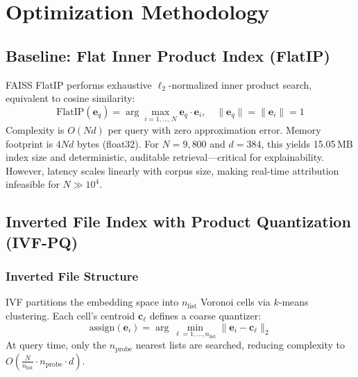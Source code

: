 \documentclass[conference]{IEEEtran}
\begin{document}
\section{Optimization Methodology}

\subsection{Baseline: Flat Inner Product Index (FlatIP)}

FAISS FlatIP performs exhaustive $\ell_2$-normalized inner product search, equivalent to cosine similarity:
\begin{equation}
\mathrm{FlatIP}(\mathbf{e}_q) = \arg\max_{i=1,\ldots,N} \mathbf{e}_q \cdot \mathbf{e}_i, \quad \|\mathbf{e}_q\| = \|\mathbf{e}_i\| = 1
\label{eq:flatip}
\end{equation}
Complexity is $O(Nd)$ per query with zero approximation error. Memory footprint is $4Nd$ bytes (float32). For $N{=}9{,}800$ and $d{=}384$, this yields 15.05\,MB index size and deterministic, auditable retrieval—critical for explainability. However, latency scales linearly with corpus size, making real-time attribution infeasible for $N \gg 10^4$.

\subsection{Inverted File Index with Product Quantization (IVF-PQ)}

\subsubsection{Inverted File Structure}
IVF partitions the embedding space into $n_{\mathrm{list}}$ Voronoi cells via $k$-means clustering. Each cell's centroid $\mathbf{c}_\ell$ defines a coarse quantizer:
\begin{equation}
\mathrm{assign}(\mathbf{e}_i) = \arg\min_{\ell=1,\ldots,n_{\mathrm{list}}} \|\mathbf{e}_i - \mathbf{c}_\ell\|_2
\label{eq:ivf_assign}
\end{equation}
At query time, only the $n_{\mathrm{probe}}$ nearest lists are searched, reducing complexity to $O\left(\frac{N}{n_{\mathrm{list}}} \cdot n_{\mathrm{probe}} \cdot d\right)$.
\end{document}
